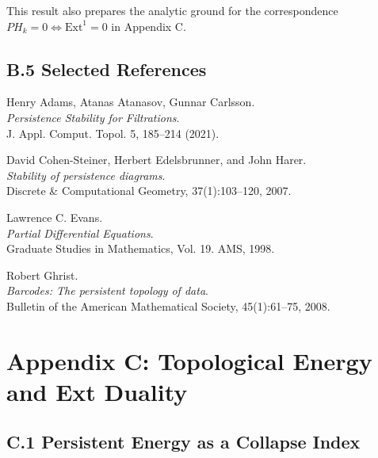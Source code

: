 \documentclass[11pt]{article}
\begin{document}
\begin{note}
This result also prepares the analytic ground for the correspondence $PH_k = 0 \Leftrightarrow \mathrm{Ext}^1 = 0$ in Appendix C.
\end{note}

\subsection*{B.5 Selected References}

\begin{thebibliography}{9}

Henry Adams, Atanas Atanasov, Gunnar Carlsson.\\
\textit{Persistence Stability for Filtrations}.\\
J. Appl. Comput. Topol. 5, 185–214 (2021).

David Cohen-Steiner, Herbert Edelsbrunner, and John Harer.\\
\textit{Stability of persistence diagrams}.\\
Discrete \& Computational Geometry, 37(1):103--120, 2007.

Lawrence C. Evans.\\
\textit{Partial Differential Equations}.\\
Graduate Studies in Mathematics, Vol. 19. AMS, 1998.

Robert Ghrist.\\
\textit{Barcodes: The persistent topology of data}.\\
Bulletin of the American Mathematical Society, 45(1):61--75, 2008.

\end{thebibliography}



\section*{Appendix C: Topological Energy and Ext Duality}

\subsection*{C.1 Persistent Energy as a Collapse Index}
\end{document}
